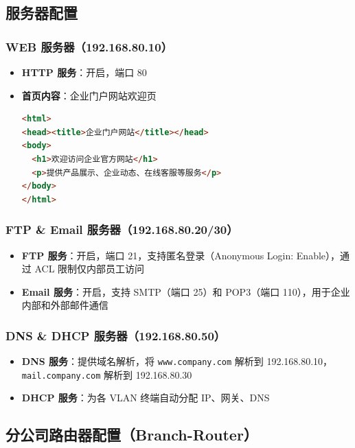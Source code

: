 \documentclass[12pt,a4paper]{ctexart}
\begin{document}
\subsection{服务器配置}

\subsubsection{WEB 服务器（192.168.80.10）}

\begin{itemize}
    \item \textbf{HTTP 服务}：开启，端口 80
    \item \textbf{首页内容}：企业门户网站欢迎页
\begin{lstlisting}[language=HTML]
<html>
<head><title>企业门户网站</title></head>
<body>
  <h1>欢迎访问企业官方网站</h1>
  <p>提供产品展示、企业动态、在线客服等服务</p>
</body>
</html>
\end{lstlisting}
\end{itemize}

\subsubsection{FTP \& Email 服务器（192.168.80.20/30）}

\begin{itemize}
    \item \textbf{FTP 服务}：开启，端口 21，支持匿名登录（Anonymous Login: Enable），通过 ACL 限制仅内部员工访问
    \item \textbf{Email 服务}：开启，支持 SMTP（端口 25）和 POP3（端口 110），用于企业内部和外部邮件通信
\end{itemize}

\subsubsection{DNS \& DHCP 服务器（192.168.80.50）}

\begin{itemize}
    \item \textbf{DNS 服务}：提供域名解析，将 \texttt{www.company.com} 解析到 192.168.80.10，\texttt{mail.company.com} 解析到 192.168.80.30
    \item \textbf{DHCP 服务}：为各 VLAN 终端自动分配 IP、网关、DNS
\end{itemize}

\subsection{分公司路由器配置（Branch-Router）}
\end{document}
